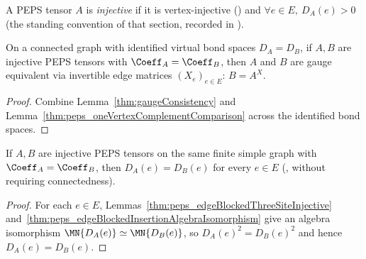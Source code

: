 \begin{definition}%
    \label{def:peps_injective_tensor}
    \leanok
    A PEPS tensor $A$ is \emph{injective} if it is vertex-injective
    (\cite[Section~3]{Molnar2018NormalPEPS}) and $\forall e\in E,\ D_A(e)>0$
    (the standing convention of that section, recorded in
    \cite{gap:peps_injective_ft_section3_route}).
\end{definition}

\begin{lemma}%
    \label{thm:fundamentalTheorem_PEPS_of_bondDim}
    \leanok
    On a connected graph with identified virtual bond spaces $D_A=D_B$, if $A,B$
    are injective PEPS tensors with $\Coeff_A=\Coeff_B$, then $A$ and $B$ are
    gauge equivalent via invertible edge matrices $(X_e)_{e\in E}$:
    $B=A^X$.
\end{lemma}
\begin{proof}\leanok
    Combine Lemma~\ref{thm:gaugeConsistency} and
    Lemma~\ref{thm:peps_oneVertexComplementComparison} across the identified
    bond spaces.
\end{proof}

\begin{lemma}%
    \label{thm:peps_injective_sameState_bondDim_eq}
    \leanok
    If $A,B$ are injective PEPS tensors on the same finite simple graph with
    $\Coeff_A=\Coeff_B$, then $D_A(e)=D_B(e)$ for every $e\in E$
    (\cite[lines~279--282 and 571--582]{Molnar2018NormalPEPS}, without
    requiring connectedness).
\end{lemma}
\begin{proof}\leanok
    For each $e\in E$, Lemmas~\ref{thm:peps_edgeBlockedThreeSiteInjective}
    and~\ref{thm:peps_edgeBlockedInsertionAlgebraIsomorphism} give an algebra
    isomorphism $\MN{D_A(e)}\simeq\MN{D_B(e)}$, so
    $D_A(e)^2=D_B(e)^2$ and hence $D_A(e)=D_B(e)$.
\end{proof}


